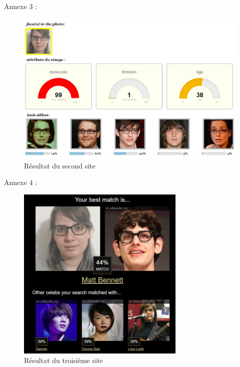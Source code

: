\documentclass[a4paper,12pt]{article}
\begin{document}
  \newpage
Annexe 3 : 
\begin{figure}[!h]
    \centering
        \includegraphics[scale=1]{images/ResS2.PNG}
        \caption{Résultat du second site}
    \end{figure} 
\newpage
Annexe 4 :
\begin{figure}[!h]
    \centering
        \includegraphics[scale=1]{images/ResS3.PNG}
        \caption{Résultat du troisième site}
    \end{figure}




	


\end{document}
